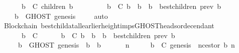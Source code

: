 \begin{isabellebody}
\ \ {\isachardoublequoteopen}{\isasymforall}\ {\isasymsigma}\ {\isasymin}\ {\isasymSigma}{\isachardot}\ {\isasymforall}\ b\ {\isasymin}\ C{\isachardot}\ children\ {\isacharparenleft}b{\isacharcomma}\ {\isasymsigma}{\isacharparenright}\ {\isacharequal}\ {\isasymemptyset}\ {\isasymand}\isanewline
\ \ \ \ {\isacharparenleft}{\isasymforall}\ b{\isacharprime}\ {\isasymin}\ C{\isachardot}\ b{\isacharprime}\ {\isasymdownharpoonright}\ b\ {\isasymlongrightarrow}\ b{\isacharprime}\ {\isasymin}\ best{\isacharunderscore}children\ {\isacharparenleft}prev\ b{\isacharprime}{\isacharcomma}\ {\isasymsigma}{\isacharparenright}{\isacharparenright}\isanewline
\ \ \ \ {\isasymlongrightarrow}\ b\ {\isasymin}\ GHOST\ {\isacharparenleft}{\isacharbraceleft}genesis{\isacharbraceright}{\isacharcomma}\ {\isasymsigma}{\isacharparenright}{\isachardoublequoteclose}\isanewline
%
\isadelimproof
\ \ %
\endisadelimproof
%
\isatagproof
{}\isamarkupfalse%
\ auto\ \isanewline
\ \ \isamarkupfalse%
%
\endisatagproof
{\isafoldproof}%
%
\isadelimproof
\isanewline
%
\endisadelimproof
\isanewline
{}\isamarkupfalse%
\ {\isacharparenleft}\ Blockchain{\isacharparenright}\ best{\isacharunderscore}child{\isacharunderscore}at{\isacharunderscore}all{\isacharunderscore}earlier{\isacharunderscore}height{\isacharunderscore}imps{\isacharunderscore}GHOST{\isacharunderscore}heads{\isacharunderscore}or{\isacharunderscore}decendant\ {\isacharcolon}\isanewline
\ \ {\isachardoublequoteopen}{\isasymforall}\ {\isasymsigma}\ {\isasymin}\ {\isasymSigma}{\isachardot}\ {\isasymforall}\ b\ {\isasymin}\ C{\isachardot}\ \isanewline
\ \ \ \ {\isacharparenleft}{\isasymforall}\ b{\isacharprime}\ {\isasymin}\ C{\isachardot}\ b{\isacharprime}\ {\isasymdownharpoonright}\ b\ {\isasymlongrightarrow}\ b{\isacharprime}\ {\isasymin}\ best{\isacharunderscore}children\ {\isacharparenleft}prev\ b{\isacharprime}{\isacharcomma}\ {\isasymsigma}{\isacharparenright}{\isacharparenright}\isanewline
\ \ \ \ {\isasymlongrightarrow}\ {\isacharparenleft}{\isasymforall}\ b{\isacharprime}{\isacharprime}\ {\isasymin}\ GHOST\ {\isacharparenleft}{\isacharbraceleft}genesis{\isacharbraceright}{\isacharcomma}\ {\isasymsigma}{\isacharparenright}{\isachardot}\ b\ {\isasymdownharpoonright}\ b{\isacharprime}{\isacharprime}{\isacharparenright}{\isachardoublequoteclose}\isanewline
%
\isadelimproof
%
\endisadelimproof
%
\isatagproof
{}\isamarkupfalse%
\ {\isacharminus}\isanewline
\ \ \isamarkupfalse%
\ {\isachardoublequoteopen}{\isasymAnd}\ n{\isachardot}\ {\isasymforall}\ {\isasymsigma}\ {\isasymin}\ {\isasymSigma}{\isachardot}\ {\isasymforall}\ b\ {\isasymin}\ C{\isachardot}\ genesis\ {\isacharequal}\ n{\isacharunderscore}cestor\ {\isacharparenleft}b{\isacharcomma}\ n{\isacharparenright}\ {\isasymand}\isanewline

\end{isabellebody}
